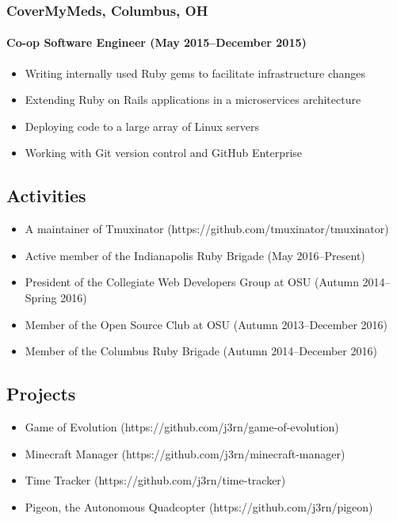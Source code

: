 \documentclass[]{article}
\begin{document}
\subsubsection*{CoverMyMeds, Columbus, OH}
\paragraph{Co-op Software Engineer (May 2015--December 2015)}
\begin{itemize}
\item Writing internally used Ruby gems to facilitate infrastructure changes
\item Extending Ruby on Rails applications in a microservices architecture
\item Deploying code to a large array of Linux servers
\item Working with Git version control and GitHub Enterprise
\end{itemize}

\subsection*{Activities}
\begin{itemize}
\item A maintainer of Tmuxinator (https://github.com/tmuxinator/tmuxinator)
\item Active member of the Indianapolis Ruby Brigade (May 2016--Present)
\item President of the Collegiate Web Developers Group at OSU (Autumn 2014--Spring 2016)
\item Member of the Open Source Club at OSU (Autumn 2013--December 2016)
\item Member of the Columbus Ruby Brigade (Autumn 2014--December 2016)
\end{itemize}

\subsection*{Projects}
\begin{itemize}
\item Game of Evolution (https://github.com/j3rn/game-of-evolution)
\item Minecraft Manager (https://github.com/j3rn/minecraft-manager)
\item Time Tracker (https://github.com/j3rn/time-tracker)
\item Pigeon, the Autonomous Quadcopter (https://github.com/j3rn/pigeon)
\end{itemize}
\end{document}

